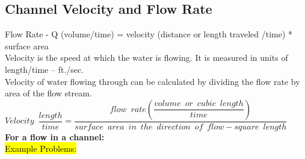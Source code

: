 \subsection{Channel Velocity and Flow Rate}
Flow Rate - Q (volume/time) = velocity (distance or length traveled /time) * surface area\\
Velocity is the speed at which the water is flowing.  It is measured in units of length/time – ft./sec.\\
Velocity of water flowing through can be calculated by dividing the flow rate by area of the flow stream.\\
\vspace{0.5cm}
$Velocity \enspace \dfrac{length}{time}= \dfrac{flow \enspace rate(\dfrac{volume \enspace or \enspace cubic \enspace length}{time})}{surface \enspace area \enspace in \enspace the \enspace direction \enspace of \enspace flow-square \enspace length}$\\
\textbf{For a flow in a channel:}\\
\vspace{0.5cm}
\hl{Example Problems:}\\
